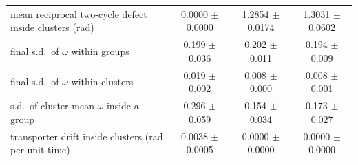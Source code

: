 \begin{tabular}{@{}lccc@{}}
mean reciprocal two-cycle defect inside clusters (rad) & 0.0000 $\pm$ 0.0000 & 1.2854 $\pm$ 0.0174 & 1.3031 $\pm$ 0.0602 \\
final s.d.\ of $\omega$ within groups & 0.199 $\pm$ 0.036 & 0.202 $\pm$ 0.011 & 0.194 $\pm$ 0.009 \\
final s.d.\ of $\omega$ within clusters & 0.019 $\pm$ 0.002 & 0.008 $\pm$ 0.000 & 0.008 $\pm$ 0.001 \\
s.d.\ of cluster-mean $\omega$ inside a group & 0.296 $\pm$ 0.059 & 0.154 $\pm$ 0.034 & 0.173 $\pm$ 0.027 \\
transporter drift inside clusters (rad per unit time) & 0.0038 $\pm$ 0.0005 & 0.0000 $\pm$ 0.0000 & 0.0000 $\pm$ 0.0000 \\
\bottomrule
\end{tabular}
